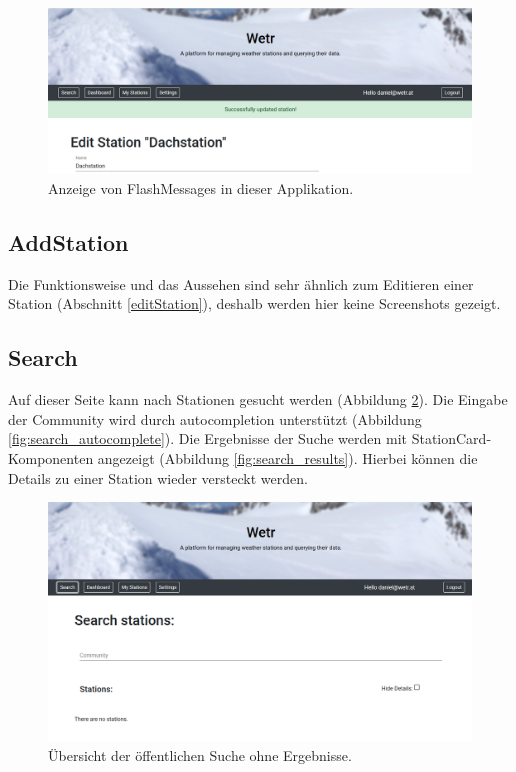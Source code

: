 \documentclass[12pt, letterpaper]{article}
\begin{document}
\begin{figure}[H]
    \centering
    \includegraphics[width=\textwidth]{img/edit/edit_success.png}
    \caption{Anzeige von FlashMessages in dieser Applikation.}
    \label{fig:editStation_success}
\end{figure}
\newpage

\subsection{AddStation}
\label{addStation}

Die Funktionsweise und das Aussehen sind sehr ähnlich zum Editieren einer Station (Abschnitt \ref{editStation}), deshalb werden hier keine Screenshots gezeigt.

\subsection{Search}
\label{search}

Auf dieser Seite kann nach Stationen gesucht werden (Abbildung \ref{fig:search_nothing}).
Die Eingabe der Community wird durch autocompletion unterstützt (Abbildung \ref{fig:search_autocomplete}).
Die Ergebnisse der Suche werden mit StationCard-Komponenten angezeigt (Abbildung \ref{fig:search_results}). Hierbei können die Details zu einer Station wieder versteckt werden.

\begin{figure}[H]
    \centering
    \includegraphics[width=\textwidth]{img/search/search_nothing.png}
    \caption{Übersicht der öffentlichen Suche ohne Ergebnisse.}
    \label{fig:search_nothing}
\end{figure}
\end{document}
